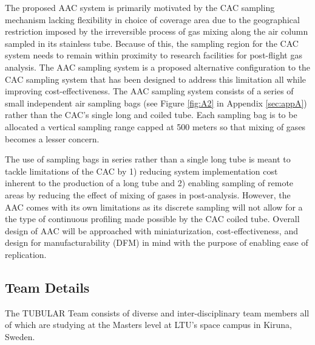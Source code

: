 \documentclass[a4paper,12pt,twoside]{article}
\begin{document}
The proposed AAC system is primarily motivated by the CAC sampling mechanism lacking flexibility in choice of coverage area due to the geographical restriction imposed by the irreversible process of gas mixing along the air column sampled in its stainless tube. Because of this, the sampling region for the CAC system needs to remain within proximity to research facilities for post-flight gas analysis. The AAC sampling system is a proposed alternative configuration to the CAC sampling system that has been designed to address this limitation all while improving cost-effectiveness. The AAC sampling system consists of a series of small independent air sampling bags (see Figure \ref{fig:A2} in Appendix \ref{sec:appA}) rather than the CAC's single long and coiled tube. Each sampling bag is to be allocated a vertical sampling range capped at 500 meters so that mixing of gases becomes a lesser concern.

The use of sampling bags in series rather than a single long tube is meant to tackle limitations of the CAC by 1) reducing system implementation cost inherent to the production of a long tube and 2) enabling sampling of remote areas by reducing the effect of mixing of gases in post-analysis. However, the AAC comes with its own limitations as its discrete sampling will not allow for a the type of continuous profiling made possible by the CAC coiled tube. Overall design of AAC will be approached with miniaturization, cost-effectiveness, and design for manufacturability (DFM) in mind with the purpose of enabling ease of replication.
\pagebreak
\subsection{Team Details}
The TUBULAR Team consists of diverse and inter-disciplinary team members all of which are studying at the Masters level at LTU's space campus in Kiruna, Sweden. 

\bigskip
\end{document}

